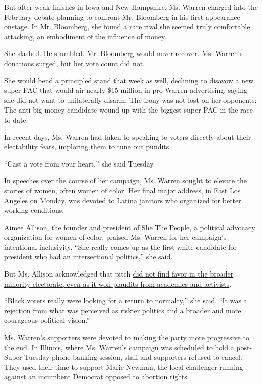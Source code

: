 But after weak finishes in Iowa and New Hampshire, Ms. Warren charged
into the February debate planning to confront Mr. Bloomberg in his first
appearance onstage. In Mr. Bloomberg, she found a rare rival she seemed
truly comfortable attacking, an embodiment of the influence of money.

She slashed. He stumbled. Mr. Bloomberg would never recover. Ms.
Warren's donations surged, but her vote count did not.

She would bend a principled stand that week as well,
\href{https://twitter.com/ShaneGoldmacher/status/1230633667195621376}{declining
to disavow} a new super PAC that would air nearly \$15 million in
pro-Warren advertising, saying she did not want to unilaterally disarm.
The irony was not lost on her opponents: The anti-big money candidate
wound up with the biggest super PAC in the race to date.

In recent days, Ms. Warren had taken to speaking to voters directly
about their electability fears, imploring them to tune out pundits.

``Cast a vote from your heart,'' she said Tuesday.

In speeches over the course of her campaign, Ms. Warren sought to
elevate the stories of women, often women of color. Her final major
address, in East Los Angeles on Monday, was devoted to Latina janitors
who organized for better working conditions.

Aimee Allison, the founder and president of She The People, a political
advocacy organization for women of color, praised Ms. Warren for her
campaign's intentional inclusivity. ``She really comes up as the first
white candidate for president who had an intersectional politics,'' she
said.

But Ms. Allison acknowledged that pitch
\href{https://www.nytimes.com/2020/02/28/us/politics/elizabeth-warren-black-vote.html}{did
not find favor in the broader minority electorate, even as it won
plaudits from academics and activists}.

``Black voters really were looking for a return to normalcy,'' she said.
``It was a rejection from what was perceived as riskier politics and a
broader and more courageous political vision.''

Ms. Warren's supporters were devoted to making the party more
progressive to the end. In Illinois, where Ms. Warren's campaign was
scheduled to hold a post-Super Tuesday phone banking session, staff and
supporters refused to cancel. They used their time to support Marie
Newman, the local challenger running against an incumbent Democrat
opposed to abortion rights.

